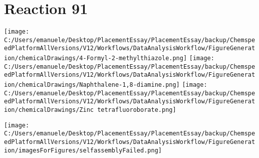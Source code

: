 \documentclass{article}%
\begin{document}
\section*{Reaction 91}%
%
\begin{scheme}[H]%
\begin{minipage}{0.5\textwidth}%
\texttt{[image: C:/Users/emanuele/Desktop/PlacementEssay/PlacementEssay/backup/ChemspeedPlatformAllVersions/V12/Workflows/DataAnalysisWorkflow/FigureGeneration/chemicalDrawings/4-Formyl-2-methylthiazole.png]}%
\texttt{[image: C:/Users/emanuele/Desktop/PlacementEssay/PlacementEssay/backup/ChemspeedPlatformAllVersions/V12/Workflows/DataAnalysisWorkflow/FigureGeneration/chemicalDrawings/Naphthalene-1,8-diamine.png]}%
\texttt{[image: C:/Users/emanuele/Desktop/PlacementEssay/PlacementEssay/backup/ChemspeedPlatformAllVersions/V12/Workflows/DataAnalysisWorkflow/FigureGeneration/chemicalDrawings/Zinc tetrafluoroborate.png]}%
\end{minipage}%
\begin{minipage}{0.5\textwidth}%
\begin{center}%
\texttt{[image: C:/Users/emanuele/Desktop/PlacementEssay/PlacementEssay/backup/ChemspeedPlatformAllVersions/V12/Workflows/DataAnalysisWorkflow/FigureGeneration/imagesForFigures/selfassemblyFailed.png]}%
\end{center}%
\end{minipage}%
\caption{Self-assembly of components 1, 21, with Zinc(II) in a 3.0:1.5:1.0 molar ratio in CH$_3$CN at 60\textdegree C for 40h. These are the reagents (starting materials) for reaction 91.}%
\end{scheme}%
\end{document}
